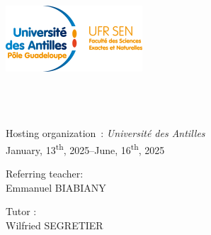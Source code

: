 \begin{titlepage}
	\begin{center}
		\includegraphics[scale=1.80]{../imgs/logo_ufr_sen.png} \\[2cm]
		\hspace{2cm}

		\HRule \\[0.4cm]
		\@title
		\HRule \\[1cm]

		\@author \\ [1.5cm]

		{\large Hosting organization~: \textsl{Université des Antilles}} \\[1.5cm]

		{\large January, 13\textsuperscript{th}, 2025–June, 16\textsuperscript{th}, 2025} \\ [2cm]

		\begin{minipage}{0.7\textwidth}
			\begin{flushleft}
				Referring teacher:\\
				\hspace{0.2cm}  Emmanuel \textsc{BIABIANY}
			\end{flushleft}
		\end{minipage}

		\vspace{-1cm}
		\hspace{9cm}
		\begin{minipage}{0.3\textwidth}
			\begin{flushleft}
				Tutor :\\
				\hspace{0.2cm} Wilfried \textsc{SEGRETIER}
			\end{flushleft}
		\end{minipage}\\[4cm]

		\@date
	\end{center}
\end{titlepage}
